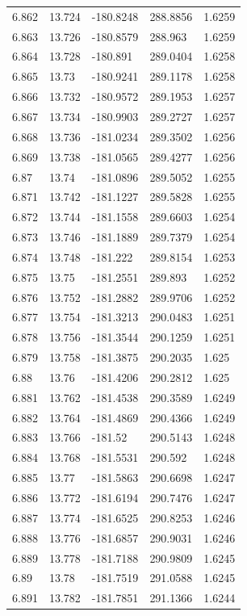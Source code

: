\begin{tabular}{lllll}
6.862 & 13.724 & -180.8248 & 288.8856 & 1.6259 \\
6.863 & 13.726 & -180.8579 & 288.963 & 1.6259 \\
6.864 & 13.728 & -180.891 & 289.0404 & 1.6258 \\
6.865 & 13.73 & -180.9241 & 289.1178 & 1.6258 \\
6.866 & 13.732 & -180.9572 & 289.1953 & 1.6257 \\
6.867 & 13.734 & -180.9903 & 289.2727 & 1.6257 \\
6.868 & 13.736 & -181.0234 & 289.3502 & 1.6256 \\
6.869 & 13.738 & -181.0565 & 289.4277 & 1.6256 \\
6.87 & 13.74 & -181.0896 & 289.5052 & 1.6255 \\
6.871 & 13.742 & -181.1227 & 289.5828 & 1.6255 \\
6.872 & 13.744 & -181.1558 & 289.6603 & 1.6254 \\
6.873 & 13.746 & -181.1889 & 289.7379 & 1.6254 \\
6.874 & 13.748 & -181.222 & 289.8154 & 1.6253 \\
6.875 & 13.75 & -181.2551 & 289.893 & 1.6252 \\
6.876 & 13.752 & -181.2882 & 289.9706 & 1.6252 \\
6.877 & 13.754 & -181.3213 & 290.0483 & 1.6251 \\
6.878 & 13.756 & -181.3544 & 290.1259 & 1.6251 \\
6.879 & 13.758 & -181.3875 & 290.2035 & 1.625 \\
6.88 & 13.76 & -181.4206 & 290.2812 & 1.625 \\
6.881 & 13.762 & -181.4538 & 290.3589 & 1.6249 \\
6.882 & 13.764 & -181.4869 & 290.4366 & 1.6249 \\
6.883 & 13.766 & -181.52 & 290.5143 & 1.6248 \\
6.884 & 13.768 & -181.5531 & 290.592 & 1.6248 \\
6.885 & 13.77 & -181.5863 & 290.6698 & 1.6247 \\
6.886 & 13.772 & -181.6194 & 290.7476 & 1.6247 \\
6.887 & 13.774 & -181.6525 & 290.8253 & 1.6246 \\
6.888 & 13.776 & -181.6857 & 290.9031 & 1.6246 \\
6.889 & 13.778 & -181.7188 & 290.9809 & 1.6245 \\
6.89 & 13.78 & -181.7519 & 291.0588 & 1.6245 \\
6.891 & 13.782 & -181.7851 & 291.1366 & 1.6244 \\

\end{tabular}
